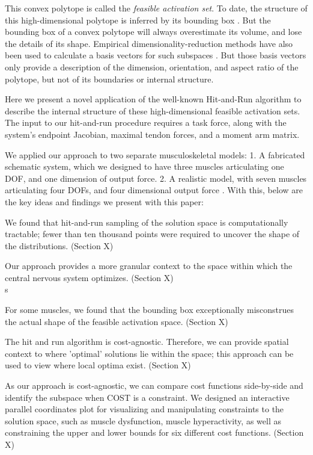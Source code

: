 This convex polytope is called the \emph{feasible activation set}. To date, the structure of this high-dimensional polytope is inferred by its bounding box  \cite{kutch2011muscle,sohn2013cat_bounding_box,Valero-Cuevas2015high-dimensional}.  But the bounding box of a convex polytope will always overestimate its volume, and lose the details of its shape.  Empirical dimensionality-reduction methods have also been used to calculate a basis vectors for such subspaces \cite{Clewley2008Estimating,davella2005shared,krishnamoorthy2003muscle}. But those basis  vectors only provide a description of the dimension, orientation, and aspect ratio of the polytope, but not of its boundaries or internal  structure.

Here we present a novel application of the well-known Hit-and-Run algorithm \cite{smith1984efficient} to describe the internal structure of these high-dimensional feasible activation sets. The input to our hit-and-run procedure requires a task force, along with the system's endpoint Jacobian, maximal tendon forces, and a moment arm matrix.

We applied our approach to two separate musculoskeletal models:
1. A fabricated schematic system, which we designed to have three muscles articulating one DOF, and one dimension of output force.
2. A realistic model, with seven muscles articulating four DOFs, and four dimensional output force \cite{Valero-Cuevas1998Large}.
With this, below are the key ideas and findings we present with this paper:\\ 

\begin{itemize}

\end{itemize}
\item We found that hit-and-run sampling of the solution space is computationally tractable; fewer than ten thousand points were required to uncover the shape of the distributions. (Section X)\\
\item Our approach provides a more granular context to the space within which the central nervous system optimizes. (Section X)\\s
\item For some muscles, we found that the bounding box exceptionally misconstrues the actual shape of the feasible activation space. (Section X)\\
\item The hit and run algorithm is cost-agnostic. Therefore, we can provide spatial context to where 'optimal' solutions lie within the space; this approach can be used to view where local optima exist. (Section X)\\
\item As our approach is cost-agnostic, we can compare cost functions side-by-side and identify the subspace when COST is a constraint. We designed an interactive parallel coordinates plot for visualizing and manipulating constraints to the solution space, such as muscle dysfunction, muscle hyperactivity, as well as constraining the upper and lower bounds for six different cost functions. (Section X)\\

